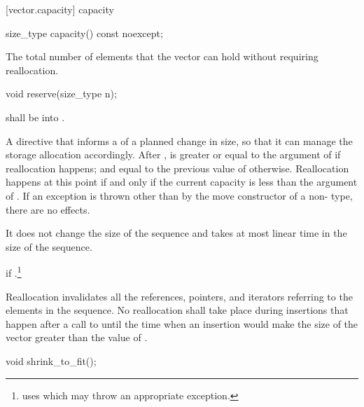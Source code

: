 [vector.capacity]{ capacity}

%
\begin{itemdecl}
size_type capacity() const noexcept;
\end{itemdecl}

\begin{itemdescr}
\pnum
\returns
The total number of elements that the vector can hold
without requiring reallocation.
\end{itemdescr}

%
\begin{itemdecl}
void reserve(size_type n);
\end{itemdecl}

\begin{itemdescr}
\pnum
\requires {} shall be  into .

\pnum
\effects
A directive that informs a
of a planned change in size, so that it can manage the storage allocation accordingly.
After
,
is greater or equal to the argument of
if reallocation happens; and equal to the previous value of
otherwise.
Reallocation happens at this point if and only if the current capacity is less than the
argument of
. If an exception is thrown
other than by the move constructor of a non- type,
there are no effects.

\pnum
\complexity
It does not change the size of the sequence and takes at most linear
time in the size of the sequence.

\pnum
\throws
{} if .\footnote{ uses  which
may throw an appropriate exception.}

\pnum
\notes
Reallocation invalidates all the references, pointers, and iterators
referring to the elements in the sequence.
No reallocation shall take place during insertions that happen
after a call to
until the time when an insertion would make the size of the vector
greater than the value of
.
\end{itemdescr}

%
\begin{itemdecl}
void shrink_to_fit();
\end{itemdecl}

